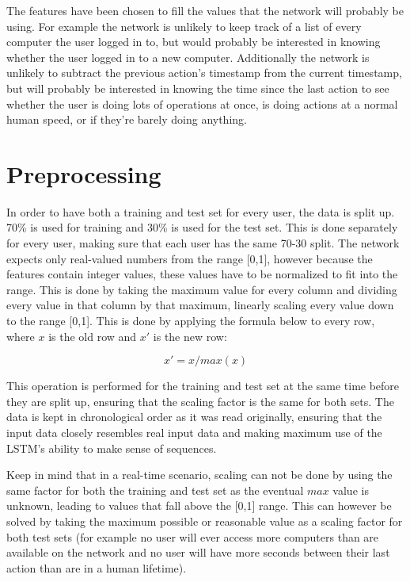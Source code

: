 The features have been chosen to fill the values that the network will probably be using. For example the network is unlikely to keep track of a list of every computer the user logged in to, but would probably be interested in knowing whether the user logged in to a new computer. Additionally the network is unlikely to subtract the previous action's timestamp from the current timestamp, but will probably be interested in knowing the time since the last action to see whether the user is doing lots of operations at once, is doing actions at a normal human speed, or if they're barely doing anything.

\section{Preprocessing}
In order to have both a training and test set for every user, the data is split up. 70\% is used for training and 30\% is used for the test set. This is done separately for every user, making sure that each user has the same 70-30 split. The network expects only real-valued numbers from the range [0,1], however because the features contain integer values, these values have to be normalized to fit into the range. This is done by taking the maximum value for every column and dividing every value in that column by that maximum, linearly scaling every value down to the range [0,1]. This is done by applying the formula below to every row, where $x$ is the old row and $x'$ is the new row:

$$ x' = x / max(x) $$

This operation is performed for the training and test set at the same time before they are split up, ensuring that the scaling factor is the same for both sets. The data is kept in chronological order as it was read originally, ensuring that the input data closely resembles real input data and making maximum use of the LSTM's ability to make sense of sequences.

Keep in mind that in a real-time scenario, scaling can not be done by using the same factor for both the training and test set as the eventual $max$ value is unknown, leading to values that fall above the [0,1] range. This can however be solved by taking the maximum possible or reasonable value as a scaling factor for both test sets (for example no user will ever access more computers than are available on the network and no user will have more seconds between their last action than are in a human lifetime).

